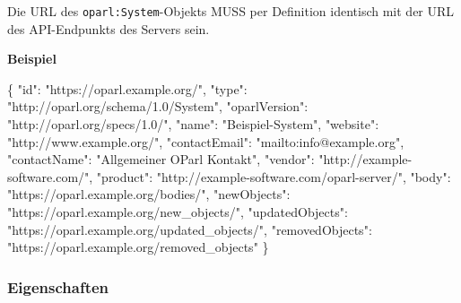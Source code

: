 \documentclass[,a4paper]{article}
\newenvironment{Shaded}{}{}
\newcommand{\DataTypeTok}[1]{\textcolor[rgb]{0.56,0.13,0.00}{{#1}}}
\newcommand{\StringTok}[1]{\textcolor[rgb]{0.25,0.44,0.63}{{#1}}}
\newcommand{\FunctionTok}[1]{\textcolor[rgb]{0.02,0.16,0.49}{{#1}}}
\begin{document}
Die URL des \texttt{oparl:System}-Objekts MUSS per Definition identisch
mit der URL des API-Endpunkts des Servers sein.

\textbf{Beispiel}

\begin{Shaded}
\begin{Highlighting}[]
\FunctionTok{\{}
    \DataTypeTok{"id"}\FunctionTok{:} \StringTok{"https://oparl.example.org/"}\FunctionTok{,}
    \DataTypeTok{"type"}\FunctionTok{:} \StringTok{"http://oparl.org/schema/1.0/System"}\FunctionTok{,}
    \DataTypeTok{"oparlVersion"}\FunctionTok{:} \StringTok{"http://oparl.org/specs/1.0/"}\FunctionTok{,}
    \DataTypeTok{"name"}\FunctionTok{:} \StringTok{"Beispiel-System"}\FunctionTok{,}
    \DataTypeTok{"website"}\FunctionTok{:} \StringTok{"http://www.example.org/"}\FunctionTok{,}
    \DataTypeTok{"contactEmail"}\FunctionTok{:} \StringTok{"mailto:info@example.org"}\FunctionTok{,}
    \DataTypeTok{"contactName"}\FunctionTok{:} \StringTok{"Allgemeiner OParl Kontakt"}\FunctionTok{,}
    \DataTypeTok{"vendor"}\FunctionTok{:} \StringTok{"http://example-software.com/"}\FunctionTok{,}
    \DataTypeTok{"product"}\FunctionTok{:} \StringTok{"http://example-software.com/oparl-server/"}\FunctionTok{,}
    \DataTypeTok{"body"}\FunctionTok{:} \StringTok{"https://oparl.example.org/bodies/"}\FunctionTok{,}
    \DataTypeTok{"newObjects"}\FunctionTok{:} \StringTok{"https://oparl.example.org/new_objects/"}\FunctionTok{,}
    \DataTypeTok{"updatedObjects"}\FunctionTok{:} \StringTok{"https://oparl.example.org/updated_objects/"}\FunctionTok{,}
    \DataTypeTok{"removedObjects"}\FunctionTok{:} \StringTok{"https://oparl.example.org/removed_objects"}
\FunctionTok{\}}
\end{Highlighting}
\end{Shaded}

\subsubsection{Eigenschaften}\label{eigenschaften}
\end{document}
